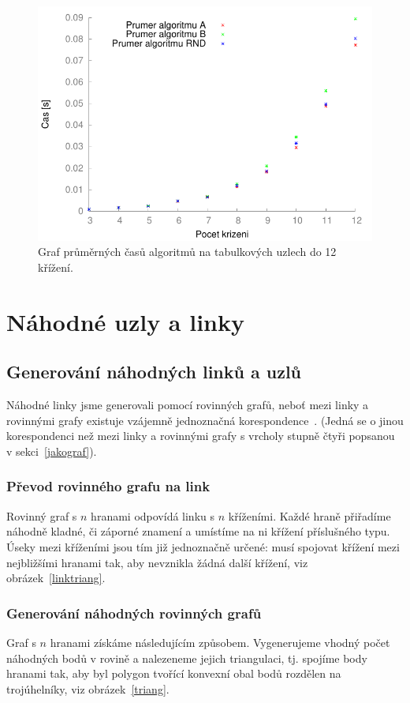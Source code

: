 \begin{figure}[p]\centering
\includegraphics{../img/srovTable}
\caption{Graf průměrných časů algoritmů na tabulkových uzlech do 12 křížení.}
\label{obr03:srovTable}
\end{figure}


\section{Náhodné uzly a linky}

\subsection{Generování náhodných linků a uzlů}
Náhodné linky jsme generovali pomocí rovinných grafů, neboť mezi linky a rovinnými grafy existuje vzájemně jednoznačná korespondence~\cite{Adams2004}. (Jedná se o jinou korespondenci než mezi linky a rovinnými grafy s vrcholy stupně čtyři popsanou v sekci~\ref{jakograf}).

\subsubsection{Převod rovinného grafu na link}
Rovinný graf s $n$ hranami odpovídá linku s $n$ kříženími. Každé hraně přiřadíme náhodně kladné, či záporné znamení a umístíme na ni křížení příslušného typu. Úseky mezi kříženími jsou tím již jednoznačně určené: musí spojovat křížení mezi nejbližšími hranami tak, aby nevznikla žádná další křížení, viz obrázek~\ref{linktriang}.

\subsubsection{Generování náhodných rovinných grafů}
Graf s $n$ hranami získáme následujícím způsobem. Vygenerujeme vhodný počet náhodných bodů v rovině a nalezeneme jejich triangulaci, tj. spojíme body hranami tak, aby byl polygon tvořící konvexní obal bodů rozdělen na trojúhelníky, viz obrázek~\ref{triang}.


